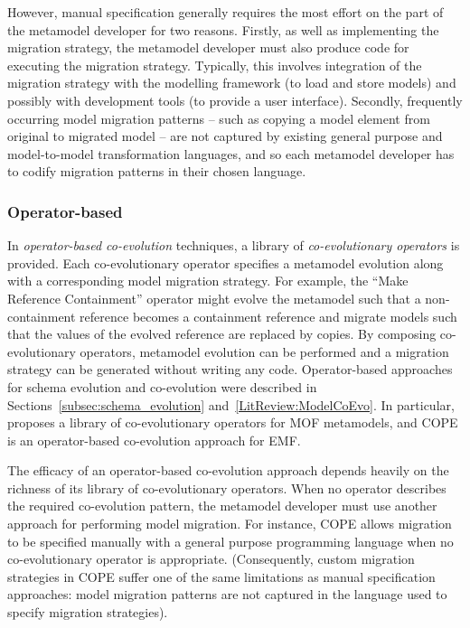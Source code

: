 However, manual specification generally requires the most effort on the part of the metamodel developer for two reasons. Firstly, as well as implementing the migration strategy, the metamodel developer must also produce code for executing the migration strategy. Typically, this involves integration of the migration strategy with the modelling framework (to load and store models) and possibly with development tools (to provide a user interface). Secondly, frequently occurring model migration patterns -- such as copying a model element from original to migrated model -- are not captured by existing general purpose and model-to-model transformation languages, and so each metamodel developer has to codify migration patterns in their chosen language.

\subsubsection{Operator-based}
\label{subsec:operator-based_co-evolution}
In \emph{operator-based co-evolution} techniques, a library of \emph{co-evolutionary operators} is provided. Each co-evolutionary operator specifies a metamodel evolution along with a corresponding model migration strategy. For example, the ``Make Reference Containment'' operator might evolve the metamodel such that a non-containment reference becomes a containment reference and migrate models such that the values of the evolved reference are replaced by copies. By composing co-evolutionary operators, metamodel evolution can be performed and a migration strategy can be generated without writing any code. Operator-based approaches for schema evolution and co-evolution were described in Sections~\ref{subsec:schema_evolution} and~\ref{LitReview:ModelCoEvo}. In particular, \cite{wachsmuth07metamodel} proposes a library of co-evolutionary operators for MOF metamodels, and COPE \cite{herrmannsdoerfer09cope} is an operator-based co-evolution approach for EMF.

The efficacy of an operator-based co-evolution approach depends heavily on the richness of its library of co-evolutionary operators. When no operator describes the required co-evolution pattern, the metamodel developer must use another approach for performing model migration. For instance, COPE allows migration to be specified manually with a general purpose programming language when no co-evolutionary operator is appropriate. (Consequently, custom migration strategies in COPE suffer one of the same limitations as manual specification approaches: model migration patterns are not captured in the language used to specify migration strategies).

